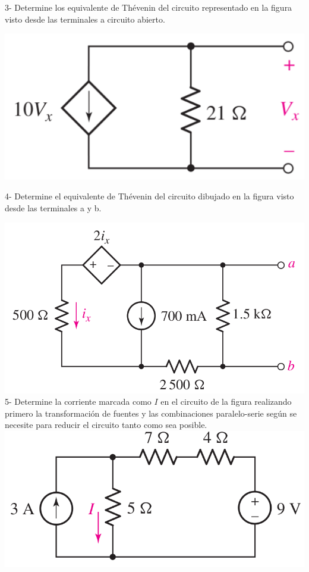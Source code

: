 \documentclass[10pt,letterpaper]{article}
\begin{document}
  3- Determine los equivalente de Thévenin del circuito representado en la figura visto desde las terminales a circuito abierto.
 
 \includegraphics[scale=0.2]{c3_1}

 \pagebreak
  
 4- Determine el equivalente de Thévenin del circuito dibujado en la figura visto desde las terminales a y b.
 
  \includegraphics[scale=0.3]{c4}
  \\
  
 5- Determine la corriente marcada como $I$ en el circuito de la figura realizando primero la transformación de fuentes y las combinaciones paralelo-serie según se necesite para reducir el circuito tanto como sea posible.
 \\
 \includegraphics[scale=0.35]{c5}
 \\
 
\end{document}
